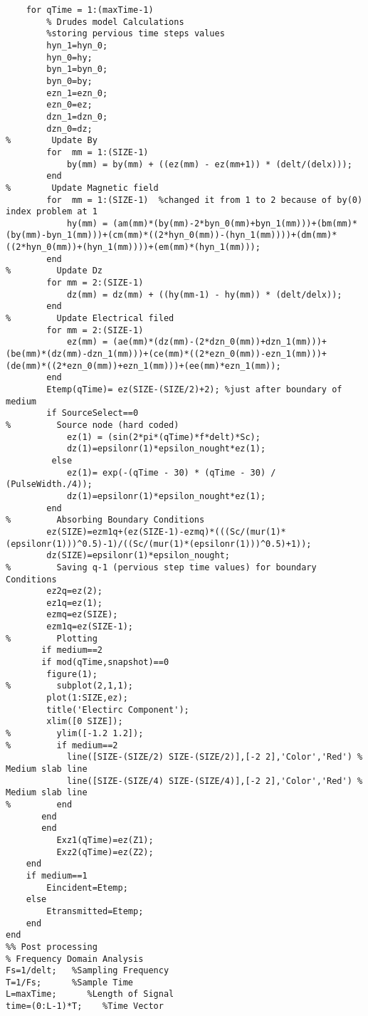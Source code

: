 \begin{lstlisting}
    for qTime = 1:(maxTime-1)
        % Drudes model Calculations
        %storing pervious time steps values
        hyn_1=hyn_0;
        hyn_0=hy;
        byn_1=byn_0;
        byn_0=by;
        ezn_1=ezn_0;
        ezn_0=ez;
        dzn_1=dzn_0;
        dzn_0=dz;
%        Update By
        for  mm = 1:(SIZE-1)
            by(mm) = by(mm) + ((ez(mm) - ez(mm+1)) * (delt/(delx)));
        end
%        Update Magnetic field
        for  mm = 1:(SIZE-1)  %changed it from 1 to 2 because of by(0) index problem at 1
            hy(mm) = (am(mm)*(by(mm)-2*byn_0(mm)+byn_1(mm)))+(bm(mm)*(by(mm)-byn_1(mm)))+(cm(mm)*((2*hyn_0(mm))-(hyn_1(mm))))+(dm(mm)*((2*hyn_0(mm))+(hyn_1(mm))))+(em(mm)*(hyn_1(mm)));
        end
%         Update Dz
        for mm = 2:(SIZE-1)
            dz(mm) = dz(mm) + ((hy(mm-1) - hy(mm)) * (delt/delx));
        end
%         Update Electrical filed
        for mm = 2:(SIZE-1)
            ez(mm) = (ae(mm)*(dz(mm)-(2*dzn_0(mm))+dzn_1(mm)))+(be(mm)*(dz(mm)-dzn_1(mm)))+(ce(mm)*((2*ezn_0(mm))-ezn_1(mm)))+(de(mm)*((2*ezn_0(mm))+ezn_1(mm)))+(ee(mm)*ezn_1(mm));
        end
        Etemp(qTime)= ez(SIZE-(SIZE/2)+2); %just after boundary of medium
        if SourceSelect==0
%         Source node (hard coded)
            ez(1) = (sin(2*pi*(qTime)*f*delt)*Sc);
            dz(1)=epsilonr(1)*epsilon_nought*ez(1);
         else
            ez(1)= exp(-(qTime - 30) * (qTime - 30) / (PulseWidth./4));
            dz(1)=epsilonr(1)*epsilon_nought*ez(1);
        end
%         Absorbing Boundary Conditions
        ez(SIZE)=ezm1q+(ez(SIZE-1)-ezmq)*(((Sc/(mur(1)*(epsilonr(1)))^0.5)-1)/((Sc/(mur(1)*(epsilonr(1)))^0.5)+1));
        dz(SIZE)=epsilonr(1)*epsilon_nought; 
%         Saving q-1 (pervious step time values) for boundary Conditions
		ez2q=ez(2);
		ez1q=ez(1);
		ezmq=ez(SIZE);
		ezm1q=ez(SIZE-1);
%         Plotting
       if medium==2
       if mod(qTime,snapshot)==0
        figure(1);
%         subplot(2,1,1);
        plot(1:SIZE,ez);
        title('Electirc Component');
        xlim([0 SIZE]);
%         ylim([-1.2 1.2]);
%         if medium==2
            line([SIZE-(SIZE/2) SIZE-(SIZE/2)],[-2 2],'Color','Red') % Medium slab line
            line([SIZE-(SIZE/4) SIZE-(SIZE/4)],[-2 2],'Color','Red') % Medium slab line
%         end
       end
       end
          Exz1(qTime)=ez(Z1);
          Exz2(qTime)=ez(Z2);
    end
    if medium==1
        Eincident=Etemp;
    else
        Etransmitted=Etemp;
    end
end
%% Post processing
% Frequency Domain Analysis
Fs=1/delt;   %Sampling Frequency
T=1/Fs;      %Sample Time
L=maxTime;      %Length of Signal
time=(0:L-1)*T;    %Time Vector

\end{lstlisting}

